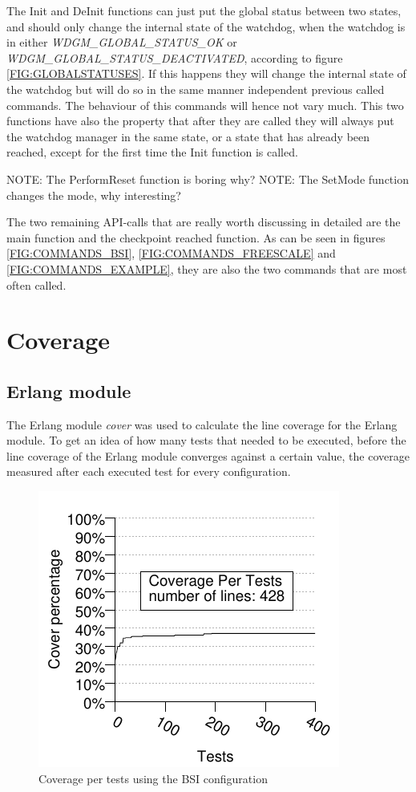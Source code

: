 The Init and DeInit functions can just put the global
status between two states, and should only change the internal state of the
watchdog, when the watchdog is in either \emph{WDGM\_GLOBAL\_STATUS\_OK}
or \emph{WDGM\_GLOBAL\_STATUS\_DEACTIVATED}, according to
figure \ref{FIG:GLOBALSTATUSES}. If this happens they will change the internal
state of the watchdog but will do so in the same manner independent previous
called commands. The behaviour of this commands will hence not vary much.
This two functions have also the property that after they are called they will
always put the watchdog manager in the same state, or a state that has already
been reached, except for the first time the Init function is called.

NOTE: The PerformReset function is boring why?
NOTE: The SetMode function changes the mode, why interesting?

The two remaining API-calls that are really worth discussing in detailed are the
main function and the checkpoint reached function. As can be seen in
figures \ref{FIG:COMMANDS_BSI}, \ref{FIG:COMMANDS_FREESCALE} and
\ref{FIG:COMMANDS_EXAMPLE}, they are also the two commands that are most
often called.

\section{Coverage}
\subsection{Erlang module}
\newcommand{\linecoverage}{100\%}
The Erlang module \emph{cover} was used to calculate the line coverage for the
Erlang module.
To get an idea of how many tests that needed to be executed, before the line
coverage of the Erlang module converges against a certain value,
the coverage measured after each executed test for every configuration.

\begin{figure}[!ht]
\begin{center}
\includegraphics{generated_pictures/coverage_per_tests_bsi.pdf}
\end{center}
\caption{Coverage per tests using the BSI configuration}
\label{FIG:COV_PER_TESTS_BSI}
\end{figure}


